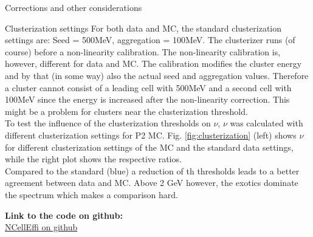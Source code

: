 \documentclass[ALICE]{ALICE_analysis_notes}
\begin{document}
\begin{section}{Corrections and other considerations}
\begin{subsection}{Clusterization settings}
	For both data and MC, the standard clusterization settings are: Seed = 500MeV, aggregation = 100MeV. The clusterizer runs (of course) before a non-linearity calibration. The non-linearity calibration is, however, different for data and MC. The calibration modifies the cluster energy and by that (in some way) also the actual seed and aggregation values. Therefore a cluster cannot consist of a leading cell with 500MeV and a second cell with 100MeV since the energy is increased after the non-linearity correction. This might be a problem for clusters near the clusterization threshold.\\
	To test the influence of the clusterization thresholds on $\nu$, $\nu$ was calculated with different clusterization settings for P2 MC. Fig. \ref{fig:clusterization} (left) shows $\nu$ for different clusterization settings of the MC and the standard data settings, while the right plot shows the respective ratios. \\
	Compared to the standard (blue) a reduction of th thresholds leads to a better agreement between data and MC. Above 2 GeV however, the exotics dominate the spectrum which makes a comparison hard.
	
	

\end{subsection}
	

\end{section}



\newpage

	
\clearpage
\centering
\textbf{Link to the code on github:}\\
\href{https://github.com/jokonig/EMCal_NCellEffi}{NCellEffi on github}


\clearpage
\end{document}
